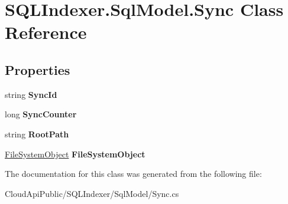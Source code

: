 \hypertarget{class_s_q_l_indexer_1_1_sql_model_1_1_sync}{\section{S\-Q\-L\-Indexer.\-Sql\-Model.\-Sync Class Reference}
\label{class_s_q_l_indexer_1_1_sql_model_1_1_sync}
}
\subsection*{Properties}
\begin{DoxyCompactItemize}
\item 
\hypertarget{class_s_q_l_indexer_1_1_sql_model_1_1_sync_ab0932c931fb34fb5c4ad5613bcb21f75}{string {\bfseries Sync\-Id}}\label{class_s_q_l_indexer_1_1_sql_model_1_1_sync_ab0932c931fb34fb5c4ad5613bcb21f75}

\item 
\hypertarget{class_s_q_l_indexer_1_1_sql_model_1_1_sync_a5365d7c952a555c2bb875cb19363ff1e}{long {\bfseries Sync\-Counter}}\label{class_s_q_l_indexer_1_1_sql_model_1_1_sync_a5365d7c952a555c2bb875cb19363ff1e}

\item 
\hypertarget{class_s_q_l_indexer_1_1_sql_model_1_1_sync_a46b8f69b15d401af37ac004e85e5d405}{string {\bfseries Root\-Path}}\label{class_s_q_l_indexer_1_1_sql_model_1_1_sync_a46b8f69b15d401af37ac004e85e5d405}

\item 
\hypertarget{class_s_q_l_indexer_1_1_sql_model_1_1_sync_adfdd4903d55094166e6491cda7ab8bc2}{\hyperlink{class_s_q_l_indexer_1_1_sql_model_1_1_file_system_object}{File\-System\-Object} {\bfseries File\-System\-Object}}\label{class_s_q_l_indexer_1_1_sql_model_1_1_sync_adfdd4903d55094166e6491cda7ab8bc2}

\end{DoxyCompactItemize}


The documentation for this class was generated from the following file\-:\begin{DoxyCompactItemize}
\item 
Cloud\-Api\-Public/\-S\-Q\-L\-Indexer/\-Sql\-Model/Sync.\-cs\end{DoxyCompactItemize}
